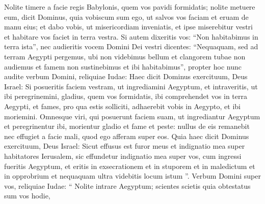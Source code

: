 \begin{biblechapter}
\begin{biblechapter}
\begin{biblechapter}
\begin{biblechapter}
\begin{biblechapter}
\begin{biblechapter}
\begin{biblechapter}
\begin{biblechapter}
\begin{biblechapter}
\begin{biblechapter}
\begin{biblechapter}
\begin{biblechapter}
\begin{biblechapter}
\begin{biblechapter}
\begin{biblechapter}
\begin{biblechapter}
\begin{biblechapter}
\begin{biblechapter}
\begin{biblechapter}
\begin{biblechapter}
\begin{biblechapter}
\begin{biblechapter}
\begin{biblechapter}
\begin{biblechapter}
\begin{biblechapter}
\begin{biblechapter}
\begin{biblechapter}
\begin{biblechapter}
\begin{biblechapter}
\begin{biblechapter}
\begin{biblechapter}
\begin{biblechapter}
\begin{biblechapter}
\begin{biblechapter}
\begin{biblechapter}
\begin{biblechapter}
\begin{biblechapter}
\begin{biblechapter}
\begin{biblechapter}
\begin{biblechapter}
\begin{biblechapter}
\begin{biblechapter}
\verse Nolite timere a facie regis Babylonis, quem vos pavidi formidatis; nolite metuere eum, dicit Dominus, quia vobiscum sum ego, ut salvos vos faciam et eruam de manu eius; 
\verse et dabo vobis, ut misericordiam inveniatis, et ipse miserebitur vestri et habitare vos faciet in terra vestra.
 \verse Si autem dixeritis vos: “Non habitabimus in terra ista”, nec audieritis vocem Domini Dei vestri 
\verse dicentes: “Nequaquam, sed ad terram Aegypti pergemus, ubi non videbimus bellum et clangorem tubae non audiemus et famem non sustinebimus et ibi habitabimus”, 
\verse propter hoc nunc audite verbum Domini, reliquiae Iudae: Haec dicit Dominus exercituum, Deus Israel: Si posueritis faciem vestram, ut ingrediamini Aegyptum, et intraveritis, ut ibi peregrinemini, 
\verse gladius, quem vos formidatis, ibi comprehendet vos in terra Aegypti, et fames, pro qua estis solliciti, adhaerebit vobis in Aegypto, et ibi moriemini. 
\verse Omnesque viri, qui posuerunt faciem suam, ut ingrediantur Aegyptum et peregrinentur ibi, morientur gladio et fame et peste: nullus de eis remanebit nec effugiet a facie mali, quod ego afferam super eos. 
\verse Quia haec dicit Dominus exercituum, Deus Israel: Sicut effusus est furor meus et indignatio mea super habitatores Ierusalem, sic effundetur indignatio mea super vos, cum ingressi fueritis Aegyptum, et eritis in exsecrationem et in stuporem et in maledictum et in opprobrium et nequaquam ultra videbitis locum istum ”.
 \verse Verbum Domini super vos, reliquiae Iudae: “ Nolite intrare Aegyptum; scientes scietis quia obtestatus sum vos hodie, 

\end{biblechapter}
\end{biblechapter}
\end{biblechapter}
\end{biblechapter}
\end{biblechapter}
\end{biblechapter}
\end{biblechapter}
\end{biblechapter}
\end{biblechapter}
\end{biblechapter}
\end{biblechapter}
\end{biblechapter}
\end{biblechapter}
\end{biblechapter}
\end{biblechapter}
\end{biblechapter}
\end{biblechapter}
\end{biblechapter}
\end{biblechapter}
\end{biblechapter}
\end{biblechapter}
\end{biblechapter}
\end{biblechapter}
\end{biblechapter}
\end{biblechapter}
\end{biblechapter}
\end{biblechapter}
\end{biblechapter}
\end{biblechapter}
\end{biblechapter}
\end{biblechapter}
\end{biblechapter}
\end{biblechapter}
\end{biblechapter}
\end{biblechapter}
\end{biblechapter}
\end{biblechapter}
\end{biblechapter}
\end{biblechapter}
\end{biblechapter}
\end{biblechapter}
\end{biblechapter}
